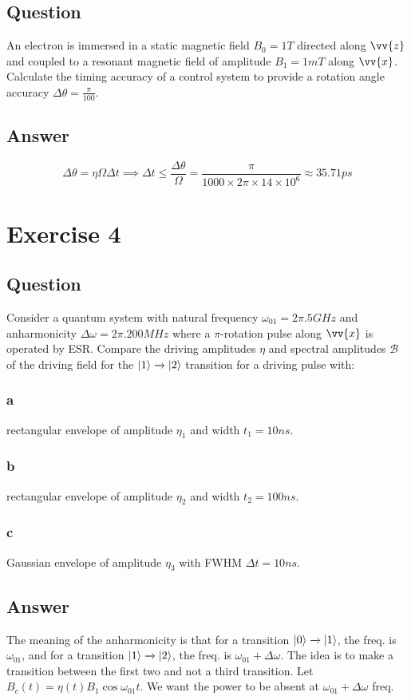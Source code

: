 \documentclass{article}
\begin{document}
\subsection{Question}
An electron is immersed in a static magnetic field $B_0 = 1T$ directed along $\vv{z}$ and coupled to a resonant magnetic field of amplitude $B_1 = 1mT$ along $\vv{x}$. Calculate the timing accuracy of a control system to provide a rotation angle accuracy $\Delta \theta = \frac{\pi}{100}$.
\subsection{Answer}
$$\Delta\theta = \eta\Omega\Delta t \implies \Delta t \leq \frac{\Delta\theta}{\Omega} = \frac{\pi}{1000\times 2\pi \times 14\times 10^6} \approx 35.71 ps$$

\section{Exercise 4}
\subsection{Question}
Consider a quantum system with natural frequency $\omega_{01} = 2\pi.5 GHz$ and anharmonicity $\Delta\omega = 2\pi.200 MHz$ where a $\pi$-rotation pulse along $\vv{x}$ is operated by ESR. Compare the driving amplitudes $\eta$ and spectral amplitudes $\mathcal{B}$ of the driving field for the $\ket{1} \xrightarrow{}  \ket{2}$ transition for a driving pulse with:  
\subsubsection{a}
rectangular envelope of amplitude $\eta_1$ and width $t_1 = 10ns$.
\subsubsection{b}
rectangular envelope of amplitude $\eta_2$ and width $t_2 = 100ns$.
\subsubsection{c}
Gaussian envelope of amplitude $\eta_3$ with FWHM $\Delta t = 10ns$.

\subsection{Answer}
The meaning of the anharmonicity is that for a transition $\ket{0}\xrightarrow{}\ket{1}$, the freq. is $\omega_{01}$, and for a transition $\ket{1}\xrightarrow{}\ket{2}$, the freq. is $\omega_{01}+\Delta\omega$. The idea is to make a transition between the first two and not a third transition. Let $B_c(t) = \eta(t)B_1\cos{\omega_{01} t}$. We want the power to be absent at $\omega_{01}+\Delta\omega$ freq.
\end{document}
